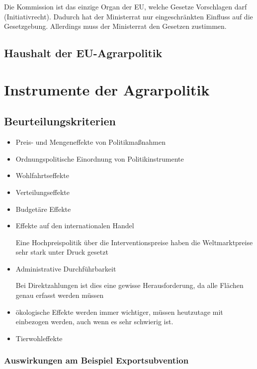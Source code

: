 \documentclass[11pt]{scrbook}
\begin{document}
Die Kommission ist das einzige Organ der \ac{EU}, welche Gesetze Vorschlagen darf (Initiativrecht).
Dadurch hat der Ministerrat nur eingeschränkten Einfluss auf die Gesetzgebung.
Allerdings muss der Ministerrat den Gesetzen zustimmen.


\subsection{Haushalt der \ac{EU}-Agrarpolitik}


\section{Instrumente der Agrarpolitik}

\subsection{Beurteilungskriterien}

\begin{itemize}
	\item Preis- und Mengeneffekte von Politikmaßnahmen
	\item Ordnungspolitische Einordnung von Politikinstrumente
	\item Wohlfahrtseffekte
	\item Verteilungseffekte
	\item Budgetäre Effekte
	\item Effekte auf den internationalen Handel
		
		Eine Hochpreispolitik über die Interventionspreise haben die Weltmarktpreise sehr stark unter Druck gesetzt

	\item Administrative Durchführbarkeit
		
		Bei Direktzahlungen ist dies eine gewisse Herausforderung, da alle Flächen genau erfasst werden müssen

	\item ökologische Effekte
		werden immer wichtiger, müssen heutzutage mit einbezogen werden, auch wenn es sehr schwierig ist.
	\item Tierwohleffekte
\end{itemize}


\subsubsection{Auswirkungen am Beispiel Exportsubvention}
\end{document}
